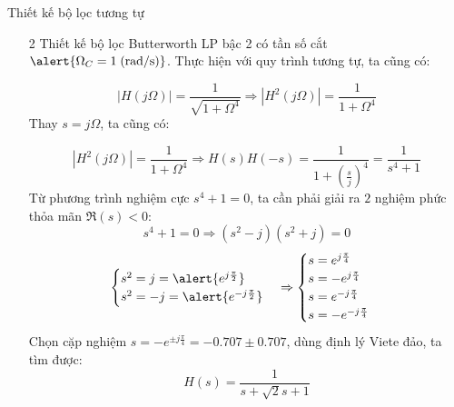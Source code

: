 \documentclass[8pt]{beamer}
\begin{document}
\begin{frame}{Thiết kế bộ lọc tương tự}
	\begin{enumerate}
		\item[2] Thiết kế bộ lọc Butterworth LP bậc 2 có tần số cắt $\alert{\Omega_{C}=1\;\text{(rad/s)}}$.  Thực hiện với quy trình tương tự, ta cũng có:

$$|H(j\Omega)|=\frac{1}{\sqrt{1+\Omega^4}}\Rightarrow |H^2(j\Omega)|=\frac{1}{1+\Omega^4}$$
Thay $s=j\Omega$, ta cũng có:

$$|H^2(j\Omega)|=\frac{1}{1+\Omega^4}\Rightarrow H(s)H(-s)=\frac{1}{1+\left(\frac{s}{j}\right)^4}=\frac{1}{s^4+1}$$
Từ phương trình nghiệm cực $s^4+1=0$, ta cần phải giải ra $2$ nghiệm phức thỏa mãn $\Re{(s)}<0$:
$$s^4+1=0\Rightarrow(s^2-j)(s^2+j)=0$$
\begin{equation*}
\begin{cases}
	s^2=j=\alert{e^{j\frac{\pi}{2}}}\\
	s^2=-j=\alert{e^{-j\frac{\pi}{2}}}\\
\end{cases}
\Rightarrow
\begin{cases}
	s=e^{j\frac{\pi}{4}}\\
	s=-e^{j\frac{\pi}{4}}\\

	s=e^{-j\frac{\pi}{4}}\\
	s=-e^{-j\frac{\pi}{4}}\\
\end{cases}
\end{equation*}
Chọn cặp nghiệm $s=-e^{\pm j\frac{\pi}{4}}=-0.707\pm 0.707$, dùng định lý Viete đảo, ta tìm được: $$H(s)=\frac{1}{s+\sqrt{2}s+1}$$
	\end{enumerate}
\end{frame}
\end{document}
